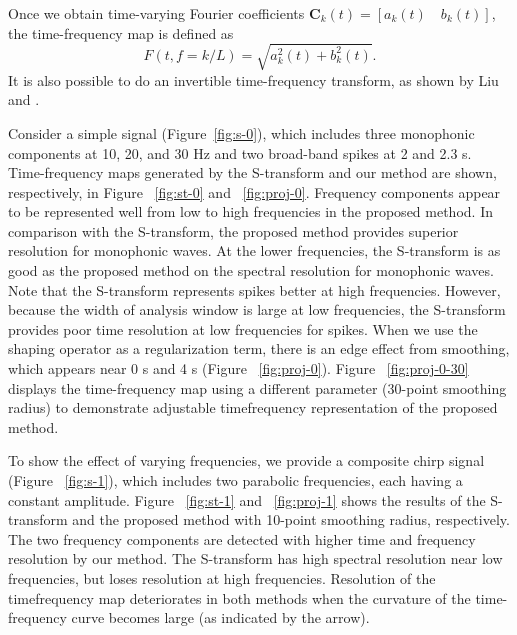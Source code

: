 Once we obtain time-varying Fourier coefficients $\mathbf{C}_{k}(t)=\left[a_{k}(t) \quad b_{k}(t)\right]$, the time-frequency map is defined as
      \begin{equation}
          F(t,f=k/L)=\sqrt{a_{k}^{2}(t)+b_{k}^{2}(t)}.
        \label{eq:eq11}
      \end{equation}
It is also possible to do an invertible time-frequency transform, as
shown by Liu and \cite {Liu2010}.


Consider a simple signal (Figure~\ref{fig:s-0}), which includes three monophonic
components at 10, 20, and 30 Hz and two broad-band spikes
at 2 and 2.3 s. Time-frequency maps generated by the S-transform
and our method are shown, respectively, in Figure ~\ref{fig:st-0} and ~\ref{fig:proj-0}.
Frequency components appear to be represented well from low
to high frequencies in the proposed method. In comparison with
the S-transform, the proposed method provides superior resolution
for monophonic waves. At the lower frequencies, the S-transform
is as good as the proposed method on the spectral resolution for
monophonic waves. Note that the S-transform represents spikes better
at high frequencies. However, because the width of analysis window
is large at low frequencies, the S-transform provides poor time
resolution at low frequencies for spikes. When we use the shaping
operator as a regularization term, there is an edge effect from
smoothing, which appears near 0 s and 4 s (Figure ~\ref{fig:proj-0}). Figure ~\ref{fig:proj-0-30}
displays the time-frequency map using a different parameter
(30-point smoothing radius) to demonstrate adjustable timefrequency
representation of the proposed method.

  
To show the effect of varying frequencies, we provide a composite
chirp signal (Figure ~\ref{fig:s-1}), which includes two parabolic frequencies,
each having a constant amplitude. Figure ~\ref{fig:st-1} and ~\ref{fig:proj-1} shows the
results of the S-transform and the proposed method with 10-point
smoothing radius, respectively. The two frequency components are
detected with higher time and frequency resolution by our method.
The S-transform has high spectral resolution near low frequencies,
but loses resolution at high frequencies. Resolution of the timefrequency
map deteriorates in both methods when the curvature
of the time-frequency curve becomes large (as indicated by
the arrow).

